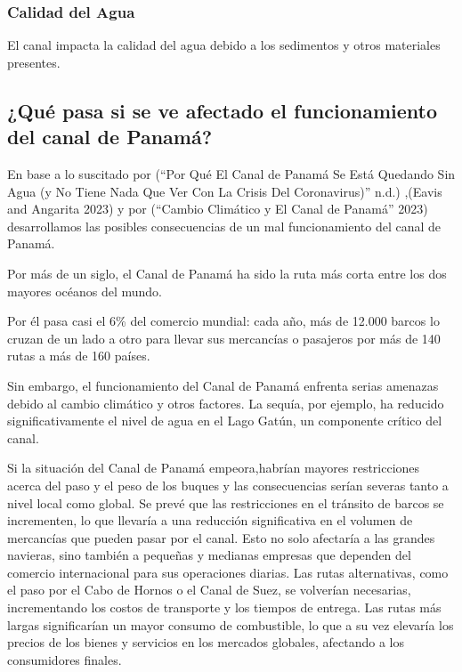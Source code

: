 \documentclass{article}
\begin{document}
\hypertarget{calidad-del-agua}{%
\subsubsection{Calidad del Agua}\label{calidad-del-agua}}

El canal impacta la calidad del agua debido a los sedimentos y otros
materiales presentes.

\hypertarget{quuxe9-pasa-si-se-ve-afectado-el-funcionamiento-del-canal-de-panamuxe1}{%
\subsection{¿Qué pasa si se ve afectado el funcionamiento del canal de
Panamá?}\label{quuxe9-pasa-si-se-ve-afectado-el-funcionamiento-del-canal-de-panamuxe1}}

En base a lo suscitado por ({``Por Qué El {Canal} de {Panamá} Se Está
Quedando Sin Agua (y No Tiene Nada Que Ver Con La Crisis Del
Coronavirus)''} n.d.) ,(Eavis and Angarita 2023) y por ({``Cambio
Climático y El {Canal} de {Panamá}''} 2023) desarrollamos las posibles
consecuencias de un mal funcionamiento del canal de Panamá.

Por más de un siglo, el Canal de Panamá ha sido la ruta más corta entre
los dos mayores océanos del mundo.

Por él pasa casi el 6\% del comercio mundial: cada año, más de 12.000
barcos lo cruzan de un lado a otro para llevar sus mercancías o
pasajeros por más de 140 rutas a más de 160 países.

Sin embargo, el funcionamiento del Canal de Panamá enfrenta serias
amenazas debido al cambio climático y otros factores. La sequía, por
ejemplo, ha reducido significativamente el nivel de agua en el Lago
Gatún, un componente crítico del canal.

Si la situación del Canal de Panamá empeora,habrían mayores
restricciones acerca del paso y el peso de los buques y las
consecuencias serían severas tanto a nivel local como global. Se prevé
que las restricciones en el tránsito de barcos se incrementen, lo que
llevaría a una reducción significativa en el volumen de mercancías que
pueden pasar por el canal. Esto no solo afectaría a las grandes
navieras, sino también a pequeñas y medianas empresas que dependen del
comercio internacional para sus operaciones diarias. Las rutas
alternativas, como el paso por el Cabo de Hornos o el Canal de Suez, se
volverían necesarias, incrementando los costos de transporte y los
tiempos de entrega. Las rutas más largas significarían un mayor consumo
de combustible, lo que a su vez elevaría los precios de los bienes y
servicios en los mercados globales, afectando a los consumidores
finales.
\end{document}
